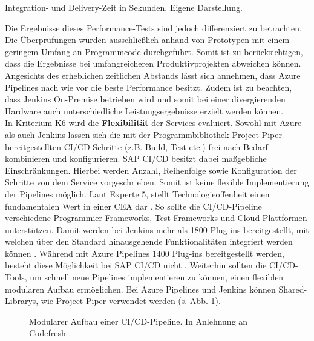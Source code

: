  \begin{center}
	\begin{table}[H]
		\centering
		\caption[Integration- und Delivery-Zeit in Sekunden]{Integration- und Delivery-Zeit in Sekunden. Eigene Darstellung.}
		\label{tab:Performance}
	\end{table}
\end{center}
\vspace*{-15mm}
 Die Ergebnisse dieses Performance-Tests sind jedoch differenziert zu betrachten. Die Überprüfungen wurden ausschließlich anhand von Prototypen mit einem geringem Umfang an Programmcode durchgeführt. Somit ist zu berücksichtigen, dass die Ergebnisse bei umfangreicheren Produktivprojekten abweichen können. Angesichts des erheblichen zeitlichen Abstands lässt sich annehmen, dass Azure Pipelines nach wie vor die beste Performance besitzt. Zudem ist zu beachten, dass Jenkins On-Premise betrieben wird und somit bei einer divergierenden Hardware auch unterschiedliche Leistungsergebnisse erzielt werden können.\\ In Kriterium K6 wird die \textbf{Flexibilität} der Services evaluiert. Sowohl mit Azure als auch Jenkins lassen sich die mit der Programmbibliothek Project Piper bereitgestellten CI/CD-Schritte (z.B. Build, Test etc.) frei nach Bedarf kombinieren und konfigurieren. SAP CI/CD besitzt dabei maßgebliche Einschränkungen. Hierbei werden Anzahl, Reihenfolge sowie Konfiguration der Schritte von dem Service vorgeschrieben. Somit ist keine flexible Implementierung der Pipelines möglich. Laut Experte 5, stellt Technologieoffenheit einen fundamentalen Wert in einer CEA dar \cite[Z. 13 ff.]{SoftwareArchitektSAPDTSIntegration.}. So sollte die CI/CD-Pipeline verschiedene Programmier-Frameworks, Test-Frameworks und Cloud-Plattformen unterstützen. Damit werden bei Jenkins mehr als 1800 Plug-ins bereitgestellt, mit welchen über den Standard hinausgehende Funktionalitäten integriert werden können \cite{.20230410c}. Während mit Azure Pipelines 1400 Plug-ins bereitgestellt werden, besteht diese Möglichkeit bei SAP CI/CD nicht \cite{.20230410d}. Weiterhin sollten die CI/CD-Tools, um schnell neue Pipelines implementieren zu können, einen flexiblen modularen Aufbau ermöglichen. Bei Azure Pipelines und Jenkins können Shared-Librarys, wie Project Piper verwendet werden (s. Abb. \ref{fig:Modular}).
 \begin{center}
	\begin{figure}[H]
		\centering
		\caption[Modularer Aufbau einer CI/CD-Pipeline]{Modularer Aufbau einer CI/CD-Pipeline. In Anlehnung an Codefresh \cite{.20230402}.}
		\label{fig:Modular}
	\end{figure}
\end{center}
